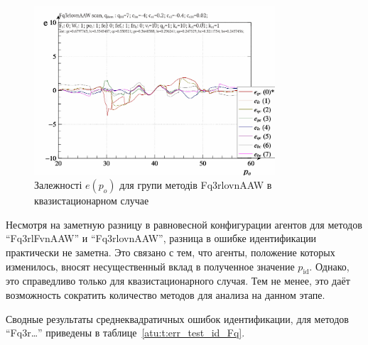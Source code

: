\begin{figure}[htb!]
  \begin{center}
    \includegraphics[width=0.8\textwidth]{p/scan/qls-p_p_e_Fq3rlovnAAW_scan.png}
  \end{center}
  \caption{Залежності $e(p_o)$ для групи методів Fq3rlovnAAW в квазистационарном случае}
  \label{atu:f:Fq3rlovnAAW_scan}
\end{figure}

Несмотря на заметную разницу в равновесной конфигурации агентов
для методов ``Fq3rlFvnAAW'' и ``Fq3rlovnAAW'',
разница в ошибке идентификации практически не заметна.
Это связано с тем, что агенты, положение которых изменилось,
вносят несущественный вклад в полученное значение $p_\mathrm{id}$.
Однако, это справедливо только для квазистационарного случая.
Тем не менее, это даёт возможность сократить количество методов для
анализа на данном этапе.

Сводные результаты среднеквадратичных ошибок идентификации, для методов ``Fq3r\ldots''
приведены в таблице~\ref{atu:t:err_test_id_Fq}.

